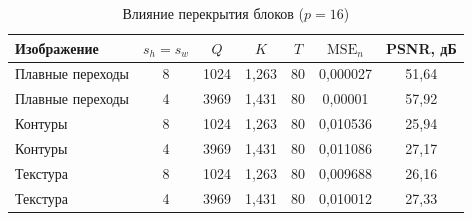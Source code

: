 \begin{table}[H]
\centering
\caption{Влияние перекрытия блоков ($p=16$)}
\label{tab:overlap}
\begin{tabular}{@{}lcccccc@{}}
\hline
Изображение & $s_h=s_w$ & $Q$ & $K$ & $T$ & $\mathrm{MSE}_n$ & PSNR, дБ \\
\hline
Плавные переходы & 8 & 1024 & 1{,}263 & 80 & 0{,}000027 & 51{,}64 \\
Плавные переходы & 4 & 3969 & 1{,}431 & 80 & 0{,}00001 & 57{,}92 \\
\hline
Контуры & 8 & 1024 & 1{,}263 & 80 & 0{,}010536 & 25{,}94 \\
Контуры & 4 & 3969 & 1{,}431 & 80 & 0{,}011086 & 27{,}17 \\
\hline
Текстура & 8 & 1024 & 1{,}263 & 80 & 0{,}009688 & 26{,}16 \\
Текстура & 4 & 3969 & 1{,}431 & 80 & 0{,}010012 & 27{,}33 \\
\hline
\end{tabular}
\end{table}

